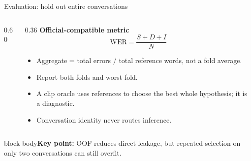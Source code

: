 \documentclass[aspectratio=169,11pt]{beamer}
\newcommand{\takeaway}[1]{\vfill\begin{beamercolorbox}[sep=2mm,wd=\linewidth]{block body}\small\textbf{Key point:} #1\end{beamercolorbox}}
\begin{document}
\begin{frame}{Evaluation: hold out entire conversations}
\begin{columns}[T]
\begin{column}{0.60\textwidth}
\centering
{}
\end{column}
\begin{column}{0.36\textwidth}
\textbf{Official-compatible metric}
\[\mathrm{WER}=\frac{S+D+I}{N}\]
\small
\begin{itemize}\item Aggregate = total errors / total reference words, not a fold average.
\item Report both folds and worst fold.
\item A clip oracle uses references to choose the best whole hypothesis; it is a diagnostic.
\item Conversation identity never routes inference.
\end{itemize}
\end{column}
\end{columns}
\takeaway{OOF reduces direct leakage, but repeated selection on only two conversations can still overfit.}
\end{frame}
\end{document}
